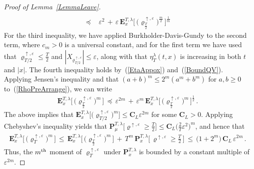 \documentclass[10pt]{article}
\numberwithin{equation}{section}
\theoremstyle{definition}
\begin{document}
\begin{proof}[Proof of Lemma~\ref{LemmaLeave}]
\begin{align}
     \\ \,\preceq \,& \,\varepsilon^2\,+\,\varepsilon \, \mathbf{E}_{x}^{T,\lambda}\Big[ \, \big(\varrho^{\uparrow, \varepsilon}_{\frac{T}{2}}  \big)^{\frac{m}{2}} \,\Big]^{\frac{1}{m}}
\end{align}
For the third inequality, we  have  applied Burkholder-Davis-Gundy to the second term, where  $c_m>0$ is a universal constant, and for the first term we have used that $\varrho^{\uparrow, \varepsilon}_{T/2} \leq \frac{T}{2}$ and $|X_{\varrho^{\uparrow, \varepsilon}_{T/2}}|\leq \varepsilon $, along with that $\eta_{T}^{\lambda}(t,x)$ is increasing in both $t$ and $|x|$.  The fourth inequality holds by~(\ref{EtaAppox}) and~(\ref{BoundQV}). Applying Jensen's inequality and  that $(a+b)^m\leq 2^m(a^m+b^m)$ for $a,b\geq 0$ to~(\ref{RhoPreArrange}), we can write
\begin{align*}
     \mathbf{E}_{x}^{T,\lambda}\Big[ \,\big(\varrho^{\uparrow, \varepsilon}_{\frac{T}{2}} \big)^m \, \Big]\,\preceq \,\varepsilon^{2m} \,+\,\varepsilon^{m} \, \mathbf{E}_{x}^{T,\lambda}\Big[ \, \big(\varrho^{\uparrow, \varepsilon}_{\frac{T}{2}} \big)^m \,\Big]^{\frac{1}{2}}\,.
\end{align*}
The above implies that  $\mathbf{E}_{x}^{T,\lambda}\big[ \big(\varrho^{\uparrow, \varepsilon}_{T/2}  \big)^m \big]\leq  \mathbf{C}_L\varepsilon^{2m}  $ for some $\mathbf{C}_L>0$.  Applying Chebyshev's inequality  yields that $\mathbf{P}_{\mu}^{T,\lambda}\big[ \varrho^{\uparrow, \varepsilon} \geq \frac{T}{2} \big] \leq \mathbf{C}_L \big(\frac{2}{T}\varepsilon^2\big)^m $, and hence that
 \begin{align*}
      \mathbf{E}_{x}^{T,\lambda}\Big[\,\big(\varrho^{\uparrow, \varepsilon}_T \big)^m \,\Big]\,\leq \,\mathbf{E}_{x}^{T,\lambda}\Big[\,\big(\varrho^{\uparrow, \varepsilon}_{\frac{T}{2}}\big)^m \,\Big]\,+\,T^m\,\mathbf{P}_{x}^{T,\lambda}\Big[ \,\varrho^{\uparrow, \varepsilon}\geq  \frac{T}{2} \, \Big]\,\leq \,\big(1+2^m\big)\,\mathbf{C}_L\,\varepsilon^{2m} \,.
 \end{align*}
Thus, the $m^{\textup{th}}$ moment of $\varrho^{\uparrow, \varepsilon}_T$ under $\mathbf{P}_{x}^{T,\lambda}$ is bounded by a constant multiple of $\varepsilon^{2m}$.  


\end{proof}
\end{document}
